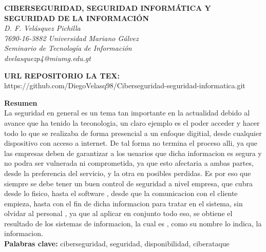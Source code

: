 \documentclass[12pt]{article}
\begin{document}
\begin{center}
    {\bfseries\uppercase{Ciberseguridad, seguridad Informática y Seguridad de la Información}} \\
\textit{D. F. Velásquez Pichilla}\\
\textit{7690-16-3882 Universidad Mariano Gálvez}\\
\textit{Seminario de Tecnología de Información}\\
\textit{dvelasquezp4@miumg.edu.gt}\\
\end{center}

\textbf{URL REPOSITORIO LA TEX: } \\
https://github.com/DiegoVelasq98/Ciberseguridad-seguridad-informatica.git

\vspace{1em}
\noindent\textbf{Resumen}\\
La seguridad en general es un tema tan importante en la actualidad debido al avance que ha tenido la teconologia, un claro ejemplo es el poder acceder y hacer todo lo que se realizaba de forma presencial a un enfoque digitial, desde cualquier dispositivo con acceso a internet.
De tal forma no termina el proceso alli, ya que las empresas deben de garantizar a los usuarios que dicha informacion es segura y no podra ser vulnerada ni comprometida, ya que esto afectaria a ambas partes, desde la preferencia del servicio, y la otra en posibles perdidas.
Es por eso que siempre se debe tener un buen control de seguridad a nivel empresa, que cubra desde lo fisico, hasta el software , desde que la comunicacion con el cliente empieza, hasta con el fin de dicha informacion para tratar en el sistema, sin olvidar al personal , ya que al aplicar en conjunto todo eso, se obtiene el resultado de los sistemas de informacion, la cual es , como su nombre lo indica, la informacion. \\

\noindent\textbf{Palabras clave: } ciberseguridad, seguridad, disponibilidad, ciberataque
\end{document}
